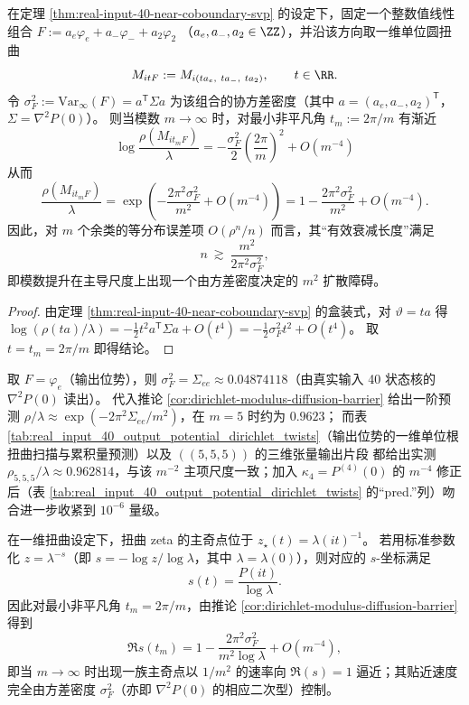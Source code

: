 \begin{corollary}\label{cor:dirichlet-modulus-diffusion-barrier}
在定理 \ref{thm:real-input-40-near-coboundary-svp} 的设定下，固定一个整数值线性组合
\(
F:=a_e\varphi_e+a_-\varphi_-+a_2\varphi_2
\)
（\(a_e,a_-,a_2\in\ZZ\)），并沿该方向取一维单位圆扭曲
\[
M_{itF}:=M_{i(t a_e,\ t a_-,\ t a_2)},\qquad t\in\RR.
\]
令
\(
\sigma_F^2:=\mathrm{Var}_\infty(F)=a^{\mathsf T}\Sigma a
\)
为该组合的协方差密度（其中 \(a=(a_e,a_-,a_2)^{\mathsf T}\)，\(\Sigma=\nabla^2P(0)\)）。
则当模数 \(m\to\infty\) 时，对最小非平凡角 \(t_m:=2\pi/m\) 有渐近
\[
\boxed{\;
\log\frac{\rho(M_{it_mF})}{\lambda}
=-\frac{\sigma_F^2}{2}\left(\frac{2\pi}{m}\right)^2+O(m^{-4})
\;}
\]
从而
\[
\boxed{\;
\frac{\rho(M_{it_mF})}{\lambda}
=\exp\!\left(-\frac{2\pi^2\sigma_F^2}{m^2}+O(m^{-4})\right)
=1-\frac{2\pi^2\sigma_F^2}{m^2}+O(m^{-4}).
\;}
\]
因此，对 \(m\) 个余类的等分布误差项 \(O(\rho^n/n)\) 而言，其“有效衰减长度”满足
\[
n\ \gtrsim\ \frac{m^2}{2\pi^2\sigma_F^2},
\]
即模数提升在主导尺度上出现一个由方差密度决定的 \(m^2\) 扩散障碍。
\end{corollary}

\begin{proof}
由定理 \ref{thm:real-input-40-near-coboundary-svp} 的盒装式，对 \(\vartheta=t a\) 得
\(
\log(\rho(ta)/\lambda)=-\frac12 t^2 a^{\mathsf T}\Sigma a+O(t^4)
=-\frac12\sigma_F^2 t^2+O(t^4)
\)。
取 \(t=t_m=2\pi/m\) 即得结论。
\end{proof}

\begin{remark}[数值闭环：输出位势的 \texorpdfstring{$m=5$}{m=5} 最坏比值]
取 \(F=\varphi_e\)（输出位势），则 \(\sigma_F^2=\Sigma_{ee}\approx 0.04874118\)（由真实输入 40 状态核的 \(\nabla^2P(0)\) 读出）。
代入推论 \ref{cor:dirichlet-modulus-diffusion-barrier} 给出一阶预测
\(
\rho/\lambda\approx \exp(-2\pi^2\Sigma_{ee}/m^2)
\)，在 \(m=5\) 时约为 \(0.9623\)；
而表 \ref{tab:real_input_40_output_potential_dirichlet_twists}（输出位势的一维单位根扭曲扫描与累积量预测）以及 \(((5,5,5))\) 的三维张量输出片段 \verb|| 都给出实测
\(
\rho_{5,5,5}/\lambda\approx 0.962814
\)，与该 \(m^{-2}\) 主项尺度一致；加入 \(\kappa_4=P^{(4)}(0)\) 的 \(m^{-4}\) 修正后（表 \ref{tab:real_input_40_output_potential_dirichlet_twists} 的“pred.”列）吻合进一步收紧到 \(10^{-6}\) 量级。
\end{remark}

\begin{remark}[“Siegel 条带”型逼近：扭曲主极点以 \texorpdfstring{$1/m^2$}{1/m2} 速度贴近 \texorpdfstring{$\Re(s)=1$}{Re(s)=1}]
在一维扭曲设定下，扭曲 zeta 的主奇点位于
\(
z_\star(t)=\lambda(it)^{-1}
\)。
若用标准参数化 \(z=\lambda^{-s}\)（即 \(s=-\log z/\log\lambda\)，其中 \(\lambda=\lambda(0)\)），则对应的 \(s\)-坐标满足
\[
s(t)=\frac{P(it)}{\log\lambda}.
\]
因此对最小非平凡角 \(t_m=2\pi/m\)，由推论 \ref{cor:dirichlet-modulus-diffusion-barrier} 得到
\[
\Re s(t_m)
=1-\frac{2\pi^2\sigma_F^2}{m^2\log\lambda}+O(m^{-4}),
\]
即当 \(m\to\infty\) 时出现一族主奇点以 \(1/m^2\) 的速率向 \(\Re(s)=1\) 逼近；其贴近速度完全由方差密度 \(\sigma_F^2\)（亦即 \(\nabla^2P(0)\) 的相应二次型）控制。
\end{remark}

